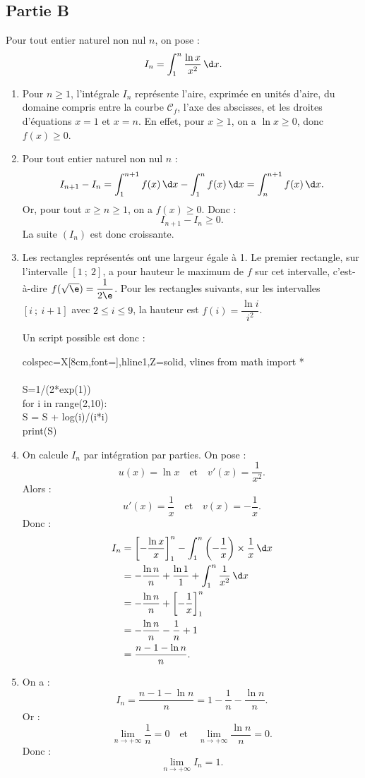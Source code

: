 \subsection*{Partie B}

Pour tout entier naturel non nul $n$, on pose :
\[
I_n=\int_1^n\dfrac{\ln x}{x^2}\,\d x.
\]

\begin{enumerate}
	\item Pour $n\geqslant 1$, l'intégrale $I_n$ représente l'aire, exprimée en unités d'aire, du domaine compris entre la courbe $\mathcal C_f$, l'axe des abscisses, et les droites d'équations $x=1$ et $x=n$.
	En effet, pour $x\geqslant 1$, on a $\ln x\geqslant 0$, donc $f(x)\geqslant 0$.

	\item Pour tout entier naturel non nul $n$ :
	\[
	I_{n+1}-I_n=\int_1^{n+1}f(x)\,\d x-\int_1^n f(x)\,\d x
	=\int_n^{n+1} f(x)\,\d x.
	\]
	Or, pour tout $x\geqslant n\geqslant 1$, on a $f(x)\geqslant 0$.
	Donc :
	\[
	I_{n+1}-I_n\geqslant 0.
	\]
	La suite $(I_n)$ est donc croissante.

	\item Les rectangles représentés ont une largeur égale à 1.
	Le premier rectangle, sur l'intervalle $[1~;~2]$, a pour hauteur le maximum de $f$ sur cet intervalle, c'est-à-dire $f(\sqrt\e)=\dfrac{1}{2\e}$.
	Pour les rectangles suivants, sur les intervalles $[i~;~i+1]$ avec $2\leqslant i\leqslant 9$, la hauteur est $f(i)=\dfrac{\ln i}{i^2}$.

	Un script possible est donc :

	\begin{center}
	\begin{tblr}{colspec={X[8cm,font=\ttfamily]},hline{1,Z}={solid}, vlines}
from math import *\\
\\
S=1/(2*exp(1))\\
for i in range(2,10):\\
\quad S = S + log(i)/(i*i)\\
print(S)
	\end{tblr}
	\end{center}

	\item On calcule $I_n$ par intégration par parties.
	On pose :
	\[
	u(x)=\ln x
	\quad\text{et}\quad
	v'(x)=\dfrac1{x^2}.
	\]
	Alors :
	\[
	u'(x)=\dfrac1x
	\quad\text{et}\quad
	v(x)=-\dfrac1x.
	\]
	Donc :
	\[
	\begin{aligned}
	I_n
	&=\left[-\dfrac{\ln x}{x}\right]_1^n-\int_1^n\left(-\dfrac1x\right)\times\dfrac1x\,\d x\\
	&=-\dfrac{\ln n}{n}+\dfrac{\ln 1}{1}+\int_1^n\dfrac1{x^2}\,\d x\\
	&=-\dfrac{\ln n}{n}+\left[-\dfrac1x\right]_1^n\\
	&=-\dfrac{\ln n}{n}-\dfrac1n+1\\
	&=\dfrac{n-1-\ln n}{n}.
	\end{aligned}
	\]

	\item On a :
	\[
	I_n=\dfrac{n-1-\ln n}{n}=1-\dfrac1n-\dfrac{\ln n}{n}.
	\]
	Or :
	\[
	\lim\limits_{n\to +\infty}\dfrac1n=0
	\quad\text{et}\quad
	\lim\limits_{n\to +\infty}\dfrac{\ln n}{n}=0.
	\]
	Donc :
	\[
	\lim\limits_{n\to +\infty} I_n=1.
	\]
\end{enumerate}
